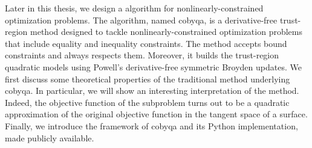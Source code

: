 Later in this thesis, we design a  algorithm for nonlinearly-constrained optimization problems.
The algorithm, named \gls{cobyqa}, is a derivative-free trust-region  method designed to tackle nonlinearly-constrained optimization problems that include equality and inequality constraints.
The method accepts bound constraints and always respects them.
Moreover, it builds the trust-region quadratic models using Powell's derivative-free symmetric Broyden updates.
We first discuss some theoretical properties of the traditional  method underlying \gls{cobyqa}.
In particular, we will show an interesting interpretation of the  method.
Indeed, the objective function of the  subproblem turns out to be a quadratic approximation of the original objective function in the tangent space of a surface.
Finally, we introduce the framework of \gls{cobyqa} and its Python implementation, made publicly available.
